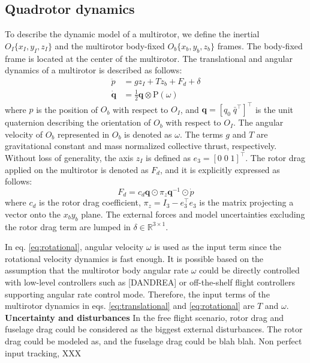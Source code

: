\documentclass[letterpaper, 10 pt, conference]{ieeeconf}  %
\begin{document}
\subsection{Quadrotor dynamics}
To describe the dynamic model of a multirotor, we define the inertial $O_I\{x_I,y_I,z_I\}$ and the multirotor body-fixed $O_b\{x_b,y_b,z_b\}$ frames. The body-fixed frame is located at the center of the multirotor. 
The translational and angular dynamics of a multirotor is described as follows:
\begin{align}
\ddot{p} &= gz_I + Tz_b + F_d + \delta \label{eq:translational} \\
\dot{\textbf{q}} &= \textstyle{\frac{1}{2}}\textbf{q}\otimes \text{P}(\omega) \label{eq:rotational}
\end{align}
where $p$ is the position of $O_b$ with respect to $O_I$, and $\textbf{q} = [q_0\;\bar{q}^\top]^\top$ is the unit quaternion describing the orientation of $O_b$ with respect to $O_I$.
The angular velocity of $O_b$ represented in $O_b$ is denoted as $\omega$.
The terms $g$ and $T$ are gravitational constant and mass normalized collective thrust, respectively. 
Without loss of generality, the axis $z_I$ is defined as $e_3 = [0\;0\;1]^\top$.
The rotor drag applied on the multirotor is denoted as $F_d$, and it is explicitly expressed as follows:
\begin{equation}
F_d = c_d\textbf{q}\odot\pi_z\textbf{q}^{-1}\odot \dot{p} \label{eq:rotorDrag}
\end{equation}
where $c_d$ is the rotor drag coefficient, $\pi_z = I_3 - e_3^\top e_3$ is the matrix projecting a vector onto the $x_by_b$ plane.
The external forces and model uncertainties excluding the rotor drag term are lumped in $\delta \in \mathbb{R}^{3\times 1}$. 

In eq. \eqref{eq:rotational}, angular velocity $\omega$ is used as the input term since the rotational velocity dynamics is fast enough. 
It is possible based on the assumption that the multirotor body angular rate $\omega$ could be directly controlled with low-level controllers such as [DANDREA] or off-the-shelf flight controllers supporting angular rate control mode.
Therefore, the input terms of the multirotor dynamics in eqs. \eqref{eq:translational} and \eqref{eq:rotational} are $T$ and $\omega$.
\\
\textbf{Uncertainty and disturbances}
In the free flight scenario, rotor drag and fuselage drag could be considered as the biggest external disturbances.
The rotor drag could be modeled as, and the fuselage drag could be blah blah.
Non perfect input tracking, XXX
\end{document}

